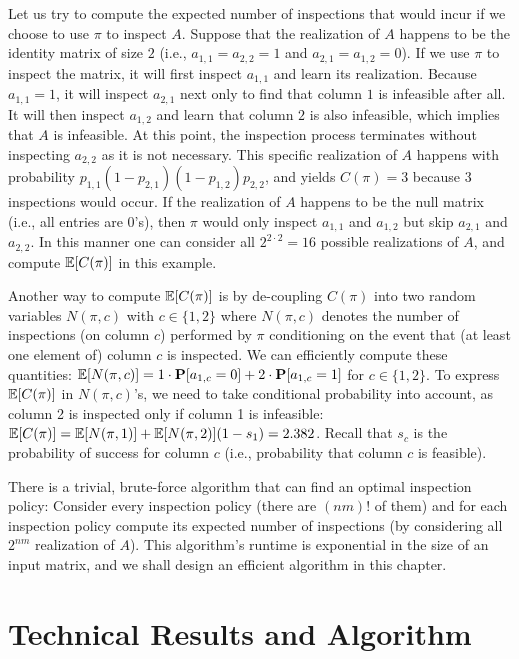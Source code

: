  Let us try to compute the expected number of inspections that would incur if we choose to use $\pi$ to inspect $A$. 
 Suppose that the realization of $A$ happens to be the identity matrix of size $2$ (i.e., $a_{1,1} = a_{2,2} = 1$ and $a_{2,1} = a_{1,2} = 0$). If we use $\pi$ to inspect the matrix, it will first inspect $a_{1,1}$ and learn its realization. Because $a_{1,1} = 1$, it will inspect $a_{2,1}$ next only to find that column $1$ is infeasible after all. It will then inspect $a_{1,2}$ and learn that column $2$ is also infeasible, which implies that $A$ is infeasible. At this point, the inspection process terminates without inspecting $a_{2,2}$ as it is not necessary.
 This specific realization of $A$ happens with probability $p_{1,1}(1 - p_{2,1})(1-p_{1,2})p_{2,2}$, and yields $C(\pi) = 3$ because 3 inspections would occur. 
 If the realization of $A$ happens to be the null matrix (i.e., all entries are $0$'s), then $\pi$ would only inspect $a_{1,1}$ and $a_{1,2}$ but skip $a_{2,1}$ and $a_{2,2}$.  In this manner one can consider all $2^{2\cdot 2} = 16$ possible realizations of $A$, and compute $\mathbb{E}[C(\pi)]$ in this example. 

Another way to compute $\mathbb{E}[C(\pi)]$ is by de-coupling $C(\pi)$ into two random variables $N(\pi, c)$ with $c\in\{1,2\}$ where $N(\pi,c)$ denotes the number of inspections (on column $c$) performed by $\pi$ conditioning on the event that (at least one element of) column $c$ is inspected.
 We can efficiently compute these quantities: $\mathbb{E}[N(\pi, c)] = 1 \cdot \mathbf{P}[a_{1,c} = 0] + 2 \cdot \mathbf{P}[a_{1,c} = 1]$ for $c\in \{1, 2\}$.
 To express $\mathbb{E}[C(\pi)]$ in $N(\pi,c)$'s, we need to take conditional probability into account, as column 2 is inspected only if column 1 is infeasible: 
 $\mathbb{E}[C(\pi)] = \mathbb{E}[N(\pi,1)] + \mathbb{E}[N(\pi,2)] (1-s_1) = 2.382$. Recall that $s_c$ is the probability of success for column $c$ (i.e., probability that column $c$ is feasible).

There is a trivial, brute-force algorithm that can find an optimal inspection policy: Consider every inspection policy (there are $(nm)!$ of them) and for each inspection policy compute its expected number of inspections (by considering all $2^{nm}$ realization of $A$). This algorithm's runtime is exponential in the size of an input matrix, and we shall design an efficient algorithm in this chapter.


\section{Technical Results and Algorithm} \label{matrix:sec:results}

